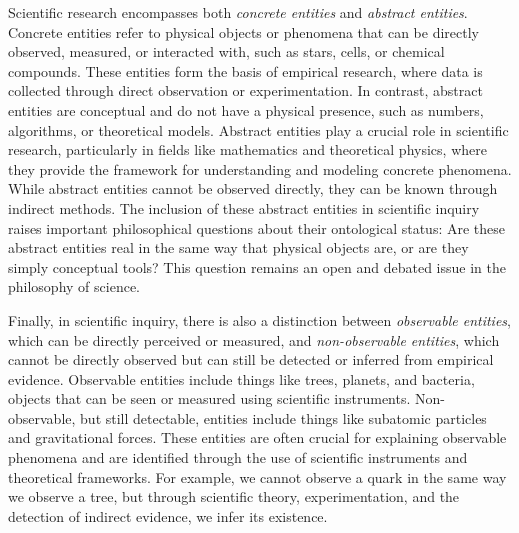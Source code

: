Scientific research encompasses both \emph{concrete entities} and \emph{abstract entities}. Concrete entities refer to physical objects or phenomena that can be directly observed, measured, or interacted with, such as stars, cells, or chemical compounds. These entities form the basis of empirical research, where data is collected through direct observation or experimentation. In contrast, abstract entities are conceptual and do not have a physical presence, such as numbers, algorithms, or theoretical models. Abstract entities play a crucial role in scientific research, particularly in fields like mathematics and theoretical physics, where they provide the framework for understanding and modeling concrete phenomena. While abstract entities cannot be observed directly, they can be known through indirect methods. The inclusion of these abstract entities in scientific inquiry raises important philosophical questions about their ontological status: Are these abstract entities real in the same way that physical objects are, or are they simply conceptual tools? This question remains an open and debated issue in the philosophy of science.

Finally, in scientific inquiry, there is also a distinction between \emph{observable entities}, which can be directly perceived or measured, and \emph{non-observable entities}, which cannot be directly observed but can still be detected or inferred from empirical evidence. Observable entities include things like trees, planets, and bacteria, objects that can be seen or measured using scientific instruments. Non-observable, but still detectable, entities include things like subatomic particles and gravitational forces. These entities are often crucial for explaining observable phenomena and are identified through the use of scientific instruments and theoretical frameworks. For example, we cannot observe a quark in the same way we observe a tree, but through scientific theory, experimentation, and the detection of indirect evidence, we infer its existence.

